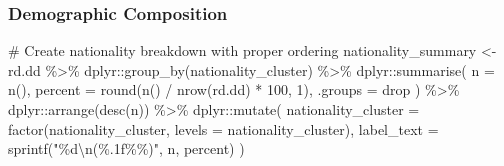 \documentclass[
  12pt,
  letterpaper,
  DIV=11,
  numbers=noendperiod]{scrartcl}
\newenvironment{Shaded}{\begin{snugshade}}{\end{snugshade}}
\newcommand{\AttributeTok}[1]{\textcolor[rgb]{0.40,0.45,0.13}{#1}}
\newcommand{\CommentTok}[1]{\textcolor[rgb]{0.37,0.37,0.37}{#1}}
\newcommand{\DecValTok}[1]{\textcolor[rgb]{0.68,0.00,0.00}{#1}}
\newcommand{\FunctionTok}[1]{\textcolor[rgb]{0.28,0.35,0.67}{#1}}
\newcommand{\NormalTok}[1]{\textcolor[rgb]{0.00,0.23,0.31}{#1}}
\newcommand{\OtherTok}[1]{\textcolor[rgb]{0.00,0.23,0.31}{#1}}
\newcommand{\SpecialCharTok}[1]{\textcolor[rgb]{0.37,0.37,0.37}{#1}}
\newcommand{\StringTok}[1]{\textcolor[rgb]{0.13,0.47,0.30}{#1}}
\theoremstyle{plain}
\theoremstyle{definition}
\begin{document}
\subsubsection{Demographic Composition}\label{demographic-composition}

\begin{Shaded}
\begin{Highlighting}[]
\CommentTok{\# Create nationality breakdown with proper ordering}
\NormalTok{nationality\_summary }\OtherTok{\textless{}{-}}\NormalTok{ rd.dd }\SpecialCharTok{\%\textgreater{}\%}
\NormalTok{  dplyr}\SpecialCharTok{::}\FunctionTok{group\_by}\NormalTok{(nationality\_cluster) }\SpecialCharTok{\%\textgreater{}\%}
\NormalTok{  dplyr}\SpecialCharTok{::}\FunctionTok{summarise}\NormalTok{(}
    \AttributeTok{n =} \FunctionTok{n}\NormalTok{(),}
    \AttributeTok{percent =} \FunctionTok{round}\NormalTok{(}\FunctionTok{n}\NormalTok{() }\SpecialCharTok{/} \FunctionTok{nrow}\NormalTok{(rd.dd) }\SpecialCharTok{*} \DecValTok{100}\NormalTok{, }\DecValTok{1}\NormalTok{),}
    \AttributeTok{.groups =} \StringTok{\textquotesingle{}drop\textquotesingle{}}
\NormalTok{  ) }\SpecialCharTok{\%\textgreater{}\%}
\NormalTok{  dplyr}\SpecialCharTok{::}\FunctionTok{arrange}\NormalTok{(}\FunctionTok{desc}\NormalTok{(n)) }\SpecialCharTok{\%\textgreater{}\%}
\NormalTok{  dplyr}\SpecialCharTok{::}\FunctionTok{mutate}\NormalTok{(}
    \AttributeTok{nationality\_cluster =} \FunctionTok{factor}\NormalTok{(nationality\_cluster, }\AttributeTok{levels =}\NormalTok{ nationality\_cluster),}
    \AttributeTok{label\_text =} \FunctionTok{sprintf}\NormalTok{(}\StringTok{"\%d}\SpecialCharTok{\textbackslash{}n}\StringTok{(\%.1f\%\%)"}\NormalTok{, n, percent)}
\NormalTok{  )}


\end{Highlighting}
\end{Shaded}
\end{document}

